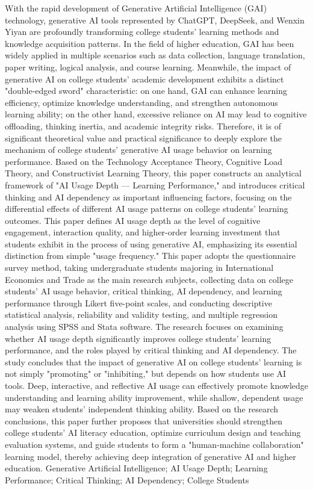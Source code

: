 \documentclass{njtech-thesis}
\begin{document}
\begin{enabstract}{With the rapid development of Generative Artificial Intelligence (GAI) technology, generative AI tools represented by ChatGPT, DeepSeek, and Wenxin Yiyan are profoundly transforming college students' learning methods and knowledge acquisition patterns. In the field of higher education, GAI has been widely applied in multiple scenarios such as data collection, language translation, paper writing, logical analysis, and course learning. Meanwhile, the impact of generative AI on college students' academic development exhibits a distinct "double-edged sword" characteristic: on one hand, GAI can enhance learning efficiency, optimize knowledge understanding, and strengthen autonomous learning ability; on the other hand, excessive reliance on AI may lead to cognitive offloading, thinking inertia, and academic integrity risks. Therefore, it is of significant theoretical value and practical significance to deeply explore the mechanism of college students' generative AI usage behavior on learning performance. Based on the Technology Acceptance Theory, Cognitive Load Theory, and Constructivist Learning Theory, this paper constructs an analytical framework of "AI Usage Depth — Learning Performance," and introduces critical thinking and AI dependency as important influencing factors, focusing on the differential effects of different AI usage patterns on college students' learning outcomes. This paper defines AI usage depth as the level of cognitive engagement, interaction quality, and higher-order learning investment that students exhibit in the process of using generative AI, emphasizing its essential distinction from simple "usage frequency." This paper adopts the questionnaire survey method, taking undergraduate students majoring in International Economics and Trade as the main research subjects, collecting data on college students' AI usage behavior, critical thinking, AI dependency, and learning performance through Likert five-point scales, and conducting descriptive statistical analysis, reliability and validity testing, and multiple regression analysis using SPSS and Stata software. The research focuses on examining whether AI usage depth significantly improves college students' learning performance, and the roles played by critical thinking and AI dependency. The study concludes that the impact of generative AI on college students' learning is not simply "promoting" or "inhibiting," but depends on how students use AI tools. Deep, interactive, and reflective AI usage can effectively promote knowledge understanding and learning ability improvement, while shallow, dependent usage may weaken students' independent thinking ability. Based on the research conclusions, this paper further proposes that universities should strengthen college students' AI literacy education, optimize curriculum design and teaching evaluation systems, and guide students to form a "human-machine collaboration" learning model, thereby achieving deep integration of generative AI and higher education.}
Generative Artificial Intelligence; AI Usage Depth; Learning Performance; Critical Thinking; AI Dependency; College Students
\end{enabstract}
\end{document}
